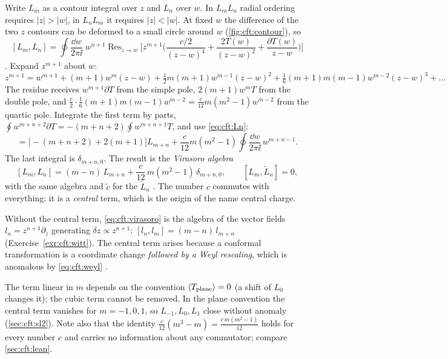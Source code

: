 Write $L_m$ as a contour integral over $z$ and $L_n$ over $w$. In $L_mL_n$ radial ordering
requires $|z|>|w|$, in $L_nL_m$ it requires $|z|<|w|$. At fixed $w$ the difference of the two
$z$ contours can be deformed to a small circle around $w$ (\cref{fig:cft:contour}), so
\begin{equation}\label{eq:cft:commcontour}
  [L_m,L_n]=\oint\frac{\dd w}{2\pi\ii}\;w^{n+1}\operatorname{Res}_{z\to w}
  \Big[z^{m+1}\Big(\frac{c/2}{(z-w)^4}+\frac{2T(w)}{(z-w)^2}+\frac{\partial T(w)}{z-w}\Big)\Big]
\end{equation}
. Expand $z^{m+1}$ about $w$:
\begin{equation*}
  z^{m+1}=w^{m+1}+(m+1)w^m(z-w)+\tfrac12m(m+1)w^{m-1}(z-w)^2
   +\tfrac16(m+1)m(m-1)w^{m-2}(z-w)^3+\dots
\end{equation*}
The residue receives $w^{m+1}\partial T$ from the simple pole, $2(m+1)w^mT$ from the double pole,
and $\frac c2\cdot\frac16(m+1)m(m-1)w^{m-2}=\frac c{12}m(m^2-1)w^{m-2}$ from the quartic pole.
Integrate the first term by parts,
$\oint w^{m+n+2}\partial T=-(m+n+2)\oint w^{m+n+1}T$, and use \eqref{eq:cft:Ln}:
\begin{equation*}
  [L_m,L_n]=\big[-(m+n+2)+2(m+1)\big]L_{m+n}
  +\frac{c}{12}m(m^2-1)\oint\frac{\dd w}{2\pi\ii}\,w^{m+n-1}.
\end{equation*}
The last integral is $\delta_{m+n,0}$. The result is the \emph{Virasoro
algebra}
\begin{equation}\label{eq:cft:virasoro}
  [L_m,L_n]=(m-n)\,L_{m+n}+\frac{c}{12}\,m(m^2-1)\,\delta_{m+n,0},\qquad
  [L_m,\tilde L_n]=0,
\end{equation}
with the same algebra and $\tilde c$ for the $\tilde L_n$
. The number $c$ commutes with everything: it is a
\emph{central} term, which is the origin of the name central charge.

Without the central term, \eqref{eq:cft:virasoro} is the algebra of the vector fields
$l_n=z^{n+1}\partial_z$ generating $\delta z\propto z^{n+1}$:
$[l_n,l_m]=(m-n)\,l_{m+n}$ (Exercise~\ref{exr:cft:witt}). The central term arises because a
conformal transformation is a coordinate change \emph{followed by a Weyl rescaling}, which is
anomalous by \eqref{eq:cft:weyl} .

\begin{pitfallbox}
The term linear in $m$ depends on the convention $\langle T_{\rm plane}\rangle=0$ (a shift of $L_0$
changes it); the cubic term cannot be removed. In the plane convention the central term vanishes
for $m=-1,0,1$, so $L_{-1},L_0,L_1$ close without anomaly (\cref{sec:cft:sl2}). Note also that
the identity $\frac c{12}(m^3-m)=\frac{c\,m(m^2-1)}{12}$ holds for every number $c$ and carries
no information about any commutator; compare \cref{sec:cft:lean}.
\end{pitfallbox}

